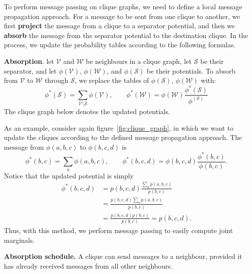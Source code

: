\documentclass{article}
\begin{document}
To perform message passing on clique graphs, we need to define a local message propagation approach. For a message to be sent from one clique to another, we first \textbf{project} the message from a clique to a separator potential, and then we \textbf{absorb} the message from the separator potential to the destination clique. In the process, we update the probability tables according to the following formulas. 
\\
\begin{theorem}
    \textbf{Absorption}. let $\mathcal{V}$ and $\mathcal{W}$ be neighbours in a clique graph, let $\mathcal{S}$ be their separator, and let $\phi(\mathcal{V})$, $\phi(\mathcal{W})$, and $\phi(\mathcal{S})$ be their potentials. To absorb from $\mathcal{V}$ to $\mathcal{W}$ through $\mathcal{S}$, we replace the tables of $\phi(\mathcal{S})$, $\phi(\mathcal{W})$ with:
    $$
        \phi^*(\mathcal{S}) = \sum_{\mathcal{V} \text{\textbackslash} \mathcal{S}} \phi(\mathcal{V}), \qquad \phi^*(\mathcal{W}) = \phi(\mathcal{W}) \frac{\phi^*(\mathcal{S})}{\phi^(\mathcal{S})}
    $$
    The clique graph below denotes the updated potentials.
    \begin{center}
    \end{center}
\end{theorem}

\noindent As an example, consider again figure~\ref{fig:clique_graph}, in which we want to update the cliques according to the defined message propagation approach. The message from $\phi(a, b, c)$ to $\phi(b, c, d)$ is
$$
    \phi^*(b, c) = \sum_{a} \phi(a, b, c), \qquad \phi^*(b, c, d) = \phi(b, c, d) \frac{\phi^*(b, c)}{\phi(b, c)}.
$$
\noindent Notice that the updated potential is simply
\begin{align*}
    \phi^*(b, c, d) &= p(b, c, d) \frac{\sum_{a} p(a, b, c)}{p(b, c)}\\[1em]
    &= \frac{p(b, c, d)\sum_{a} p(a, b, c)}{p(b, c)}\\[1em]
    &=  \frac{p(b, c, d) p(b, c)}{p(b, c)} = p(b, c, d).
\end{align*}
\noindent Thus, with this method, we perform message passing to easily compute joint marginals. 
\\
\begin{theorem}
    \textbf{Absorption schedule.} A clique can send messages to a neighbour, provided it has already received messages from all other neighbours.
\end{theorem}
\end{document}

